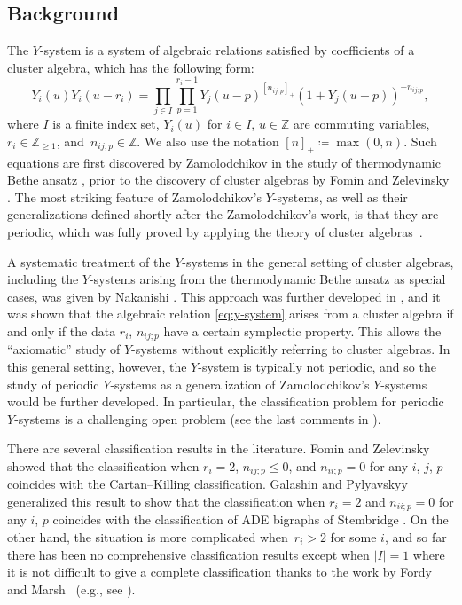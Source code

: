 \documentclass[pdftex]{sigma}
\numberwithin{equation}{section}
\theoremstyle{definition}
\newcommand*{\maxzero}[1]{[#1]_{+}}
\begin{document}
\subsection{Background}
The $Y$-system is a system of algebraic relations satisfied by coefficients of a cluster algebra,
which has the following form:
\begin{equation}\label{eq:y-system}
 Y_i (u) Y_i (u - r_i) =
 \prod_{j \in I} \prod_{p=1}^{r_i-1} Y_j(u-p)^{\maxzero{n_{ij;p}}} (1 + Y_j(u - p) )^{- n_{ij;p} },
\end{equation}
where $I$ is a finite index set, $Y_i (u)$ for $i \in I$, $u \in \mathbb{Z}$ are commuting variables,
$r_i \in \mathbb{Z}_{\geq 1}$, and~${n_{ij;p} \in \mathbb{Z}}$.
We also use the notation $\maxzero{n} \coloneqq \max(0, n)$.
Such equations are first discovered by Zamolodchikov in the study of thermodynamic Bethe ansatz \cite{Zamo},
prior to the discovery of cluster algebras by Fomin and Zelevinsky \cite{FZ1}.
The most striking feature of Zamolodchikov's \mbox{$Y$-systems}, as well as their generalizations \cite{KunibaNakanishi92, RVT}
defined shortly after the Zamolodchikov's work, is that they are periodic, which was fully proved by applying
the theory of cluster algebras~\cite{FZ_Ysystem, FZ4, IIKKNa, IIKKNb, Keller}.

A systematic treatment of the $Y$-systems in the general setting of cluster algebras, including the $Y$-systems arising from
the thermodynamic Bethe ansatz as special cases, was given by Nakanishi \cite{Nakb}.
This approach was further developed in \cite{mizuno2020difference},
and it was shown that the algebraic relation \eqref{eq:y-system} arises from a cluster algebra if and only if
the data $r_i$, $n_{ij;p}$ have a certain symplectic property.
This allows the ``axiomatic'' study of $Y$-systems without explicitly referring to cluster algebras.
In this general setting, however, the $Y$-system is typically not periodic,
and so the study of periodic $Y$-systems as a generalization of Zamolodchikov's $Y$-systems would be further developed.
In particular, the classification problem for periodic $Y$-systems is a challenging open problem (see the last comments in \cite[Section 3]{Nakb}).

There are several classification results in the literature.
Fomin and Zelevinsky \cite{FZ4} showed that the classification when $r_i = 2$, $n_{ij;p} \leq 0$, and $n_{ii;p} = 0$ for any $i$, $j$, $p$
coincides with the Cartan--Killing classification. Galashin and Pylyavskyy \cite{GalashinPylyavskyy} generalized this result to show that
the classification when $r_i = 2$ and $n_{ii;p} = 0$ for any $i$, $p$ coincides with the classification of ADE bigraphs of Stembridge \cite{Stembridge}.
On the other hand, the situation is more complicated when~${r_i > 2}$ for some $i$, and so far there has been no comprehensive classification results
except when $\lvert I \rvert = 1$ where it is not difficult to give a complete classification
thanks to the work by Fordy and Marsh~\cite{FordyMarsh} (e.g., see \cite[Example 5.6]{mizuno2020difference}).
\end{document}

